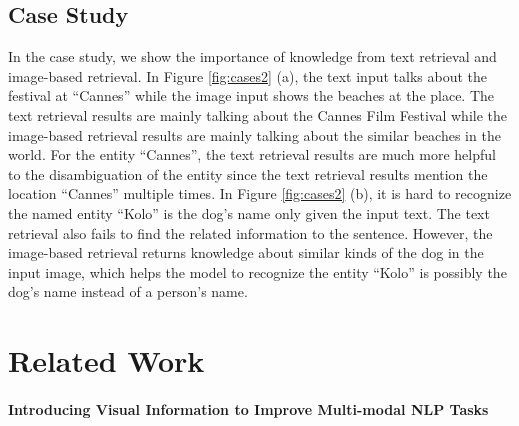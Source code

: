\documentclass[11pt]{article}
\begin{document}
\subsection{Case Study}
In the case study, we show the importance of knowledge from text retrieval and image-based retrieval. In Figure \ref{fig:cases2} (a), the text input talks about the festival at ``Cannes'' while the image input shows the beaches at the place. The text retrieval results are mainly talking about the Cannes Film Festival while the image-based retrieval results are mainly talking about the similar beaches in the world. For the entity ``Cannes'', the text retrieval results are much more helpful to the disambiguation of the entity since the text retrieval results mention the location ``Cannes'' multiple times. In Figure \ref{fig:cases2} (b), it is hard to recognize the named entity ``Kolo'' is the dog's name only given the input text. The text retrieval also fails to find the related information to the sentence. However, the image-based retrieval returns knowledge about similar kinds of the dog in the input image, which helps the model to recognize the entity ``Kolo'' is possibly the dog's name instead of a person's name.


\section{Related Work}
\paragraph{Introducing Visual Information to Improve Multi-modal NLP Tasks}
\end{document}
